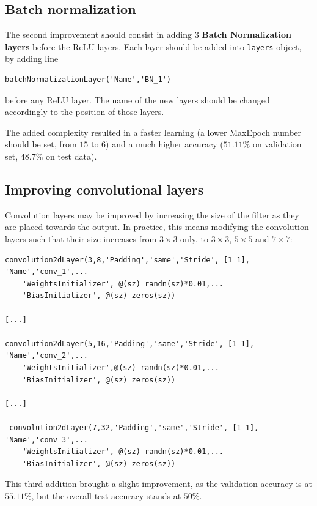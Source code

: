 \documentclass[a4paper, 11pt]{article} %
\begin{document}
\subsection{Batch normalization}

The second improvement should consist in adding $3$ \textbf{Batch Normalization layers} before the ReLU layers. Each layer should be added into \texttt{layers} object, by adding line

\begin{lstlisting}
batchNormalizationLayer('Name','BN_1')
\end{lstlisting} 

before any ReLU layer. The name of the new layers should be changed accordingly to the position of those layers.

The added complexity resulted in a faster learning (a lower MaxEpoch number should be set, from $15$ to $6$) and a much higher accuracy ($51.11\%$ on validation set, $48.7\%$ on test data).

\subsection{Improving convolutional layers}

Convolution layers may be improved by increasing the size of the filter as they are placed towards the output. In practice, this means modifying the convolution layers such that their size increases from $3\times 3$ only, to $3 \times 3$, $5\times 5$ and $7 \times 7$:

\begin{lstlisting}
convolution2dLayer(3,8,'Padding','same','Stride', [1 1], 'Name','conv_1',...
    'WeightsInitializer', @(sz) randn(sz)*0.01,...
    'BiasInitializer', @(sz) zeros(sz))

[...]

convolution2dLayer(5,16,'Padding','same','Stride', [1 1], 'Name','conv_2',...
    'WeightsInitializer',@(sz) randn(sz)*0.01,...
    'BiasInitializer', @(sz) zeros(sz))

[...]

 convolution2dLayer(7,32,'Padding','same','Stride', [1 1], 'Name','conv_3',...
    'WeightsInitializer', @(sz) randn(sz)*0.01,...
    'BiasInitializer', @(sz) zeros(sz))
\end{lstlisting}

This third addition brought a slight improvement, as the validation accuracy is at $55.11\%$, but the overall test accuracy stands at $50\%$.
\end{document}
